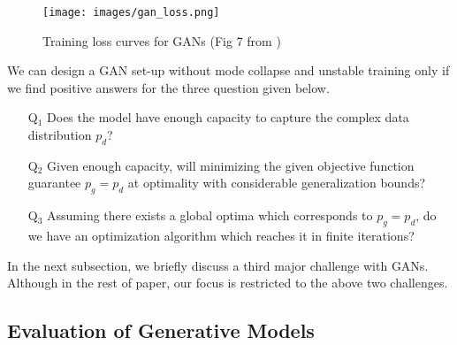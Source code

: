 \begin{figure}[!htb]
    \centering
    \texttt{[image: images/gan\_loss.png]}
    \caption{Training loss curves for GANs 
    (Fig 7 from \cite{loss_curves})}
    \label{fig:gan_loss}
\end{figure}{}



We can design a GAN set-up without mode collapse and unstable training only if we find positive answers for the three question given below.
\begin{tcolorbox}[colback=gray!03!white,colframe=black!75!black]
\begin{itemize}
    \item[Q$_1$] Does the model have enough capacity to capture the complex data distribution $p_d$?
    \item[Q$_2$] Given enough capacity, will minimizing the given objective function guarantee $p_g = p_d$ at optimality with considerable generalization bounds?
    \item[Q$_3$] Assuming there exists a global optima which corresponds to $p_g = p_d$, do we have an optimization algorithm which reaches it in finite iterations?
\end{itemize}
\end{tcolorbox}
 In the next subsection, we briefly discuss a third major challenge with GANs. Although in the rest of paper, our focus is restricted to the above two challenges.
\subsection{Evaluation of Generative Models}

